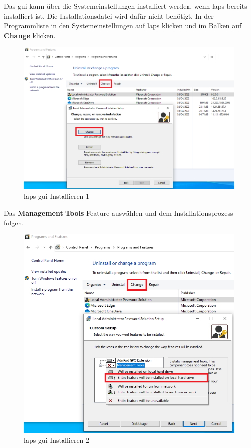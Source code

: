 Das \acrshort{gui} kann über die Systemeinstellungen installiert werden, wenn \acrshort{laps} bereits installiert ist.
Die Installationsdatei wird dafür nicht benötigt.
In der Programmliste in den Systemeinstellungen auf \acrshort{laps} klicken und im Balken auf \textbf{Change} klicken.
\begin{figure}[H]
    \centering
    \includegraphics[width=0.7\linewidth]{../img/LAPS/laps-ui-install.png}
    \caption{\acrshort{laps} \acrshort{gui} Installieren 1}
\end{figure}

Das \textbf{Management Tools} Feature auswählen und dem Installationsprozess folgen.
\begin{figure}[H]
    \centering
    \includegraphics[width=0.7\linewidth]{../img/LAPS/laps-ui-install-2.png}
    \caption{\acrshort{laps} \acrshort{gui} Installieren 2}
\end{figure}



